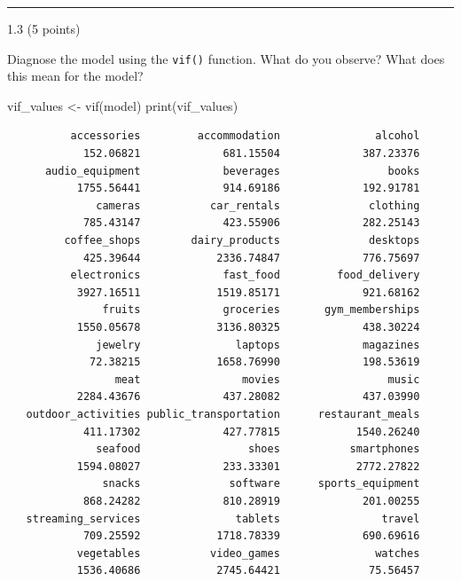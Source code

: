 \documentclass[
  letterpaper,
  DIV=11,
  numbers=noendperiod]{scrartcl}
\newenvironment{Shaded}{\begin{snugshade}}{\end{snugshade}}
\newcommand{\FunctionTok}[1]{\textcolor[rgb]{0.28,0.35,0.67}{#1}}
\newcommand{\NormalTok}[1]{\textcolor[rgb]{0.00,0.23,0.31}{#1}}
\newcommand{\OtherTok}[1]{\textcolor[rgb]{0.00,0.23,0.31}{#1}}
\begin{document}
\begin{center}\rule{0.5\linewidth}{0.5pt}\end{center}

1.3 (5 points)

Diagnose the model using the \texttt{vif()} function. What do you
observe? What does this mean for the model?

\begin{Shaded}
\begin{Highlighting}[]
\NormalTok{vif\_values }\OtherTok{\textless{}{-}} \FunctionTok{vif}\NormalTok{(model)}
\FunctionTok{print}\NormalTok{(vif\_values)}
\end{Highlighting}
\end{Shaded}

\begin{verbatim}
          accessories         accommodation               alcohol 
            152.06821             681.15504             387.23376 
      audio_equipment             beverages                 books 
           1755.56441             914.69186             192.91781 
              cameras           car_rentals              clothing 
            785.43147             423.55906             282.25143 
         coffee_shops        dairy_products              desktops 
            425.39644            2336.74847             776.75697 
          electronics             fast_food         food_delivery 
           3927.16511            1519.85171             921.68162 
               fruits             groceries       gym_memberships 
           1550.05678            3136.80325             438.30224 
              jewelry               laptops             magazines 
             72.38215            1658.76990             198.53619 
                 meat                movies                 music 
           2284.43676             437.28082             437.03990 
   outdoor_activities public_transportation      restaurant_meals 
            411.17302             427.77815            1540.26240 
              seafood                 shoes           smartphones 
           1594.08027             233.33301            2772.27822 
               snacks              software      sports_equipment 
            868.24282             810.28919             201.00255 
   streaming_services               tablets                travel 
            709.25592            1718.78339             690.69616 
           vegetables           video_games               watches 
           1536.40686            2745.64421              75.56457 
\end{verbatim}
\end{document}
